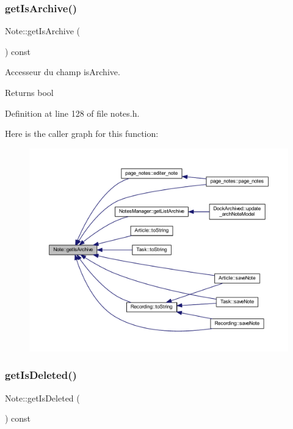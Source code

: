 \subsubsection{\texorpdfstring{get\+Is\+Archive()}{getIsArchive()}}
{\footnotesize\ttfamily Note\+::get\+Is\+Archive (\begin{DoxyParamCaption}{ }\end{DoxyParamCaption}) const\hspace{0.3cm}{\ttfamily [inline]}}



Accesseur du champ is\+Archive. 

\begin{DoxyReturn}{Returns}
bool 
\end{DoxyReturn}


Definition at line 128 of file notes.\+h.

Here is the caller graph for this function\+:\nopagebreak
\begin{figure}[H]
\begin{center}
\leavevmode
\includegraphics[width=350pt]{class_note_a3ff22c94b72b8c5cb93638bd16262d0d_icgraph}
\end{center}
\end{figure}
\mbox{\label{class_note_af56c546c7e0e471b2dd5b201d4835e37}} 
\subsubsection{\texorpdfstring{get\+Is\+Deleted()}{getIsDeleted()}}
{\footnotesize\ttfamily Note\+::get\+Is\+Deleted (\begin{DoxyParamCaption}{ }\end{DoxyParamCaption}) const\hspace{0.3cm}{\ttfamily [inline]}}



